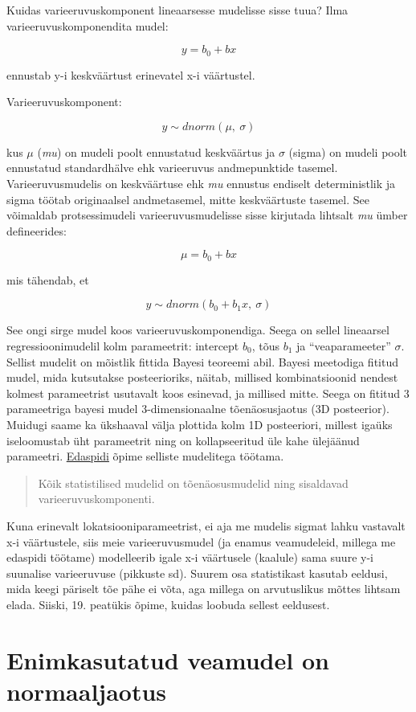 \documentclass[]{book}
\begin{document}
Kuidas varieeruvuskomponent lineaarsesse mudelisse sisse tuua? Ilma
varieeruvuskomponendita mudel:

\[y = b_0 + bx\]

ennustab y-i keskväärtust erinevatel x-i väärtustel.

Varieeruvuskomponent:

\[y\sim dnorm(\mu,~\sigma)\]

kus \(\mu\) (\emph{mu}) on mudeli poolt ennustatud keskväärtus ja
\(\sigma\) (sigma) on mudeli poolt ennustatud standardhälve ehk
varieeruvus andmepunktide tasemel. Varieeruvusmudelis on keskväärtuse
ehk \emph{mu} ennustus endiselt deterministlik ja sigma töötab
originaalsel andmetasemel, mitte keskväärtuste tasemel. See võimaldab
protsessimudeli varieeruvusmudelisse sisse kirjutada lihtsalt \emph{mu}
ümber defineerides:

\[\mu = b_0 + bx\]

mis tähendab, et

\[y \sim dnorm(b_0 + b_1x, ~\sigma)\]

See ongi sirge mudel koos varieeruvuskomponendiga. Seega on sellel
lineaarsel regressioonimudelil kolm parameetrit: intercept \(b_0\), tõus
\(b_1\) ja ``veaparameeter'' \(\sigma\). Sellist mudelit on mõistlik
fittida Bayesi teoreemi abil. Bayesi meetodiga fititud mudel, mida
kutsutakse posteerioriks, näitab, millised kombinatsioonid nendest
kolmest parameetrist usutavalt koos esinevad, ja millised mitte. Seega
on fititud 3 parameetriga bayesi mudel 3-dimensionaalne tõenäosusjaotus
(3D posteerior). Muidugi saame ka ükshaaval välja plottida kolm 1D
posteeriori, millest igaüks iseloomustab üht parameetrit ning on
kollapseeritud üle kahe ülejäänud parameetri. \href{pidev}{Edaspidi}
õpime selliste mudelitega töötama.

\begin{quote}
Kõik statistilised mudelid on tõenäosusmudelid ning sisaldavad
varieeruvuskomponenti.
\end{quote}

Kuna erinevalt lokatsiooniparameetrist, ei aja me mudelis sigmat lahku
vastavalt x-i väärtustele, siis meie varieeruvusmudel (ja enamus
veamudeleid, millega me edaspidi töötame) modelleerib igale x-i
väärtusele (kaalule) sama suure y-i suunalise varieeruvuse (pikkuste
sd). Suurem osa statistikast kasutab eeldusi, mida keegi päriselt tõe
pähe ei võta, aga millega on arvutuslikus mõttes lihtsam elada. Siiski,
19. peatükis õpime, kuidas loobuda sellest eeldusest.

\section*{Enimkasutatud veamudel on
normaaljaotus}\label{enimkasutatud-veamudel-on-normaaljaotus}
\end{document}
